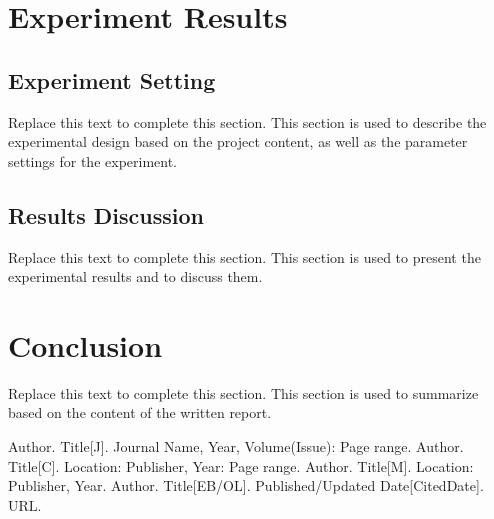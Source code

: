 \documentclass[a4paper, utk8]{ctexart}
\begin{document}
    \section{Experiment Results}
    
    \subsection{Experiment Setting}
    
    Replace this text to complete this section. This section is used to describe the experimental design based on the project content, as well as the parameter settings for the experiment.
    
    \subsection{Results Discussion}
    
    Replace this text to complete this section. This section is used to present the experimental results and to discuss them.
    
    \section{Conclusion}
    
    Replace this text to complete this section. This section is used to summarize based on the content of the written report.

    \let\cleardoublepage\clearpage

    \begin{thebibliography}{99}  
		Author. Title[J]. Journal Name, Year, Volume(Issue): Page range.
		Author. Title[C]. Location: Publisher, Year: Page range.
		Author. Title[M]. Location: Publisher, Year.
		Author. Title[EB/OL]. Published/Updated Date[CitedDate]. URL.
    \end{thebibliography}
\end{document}
